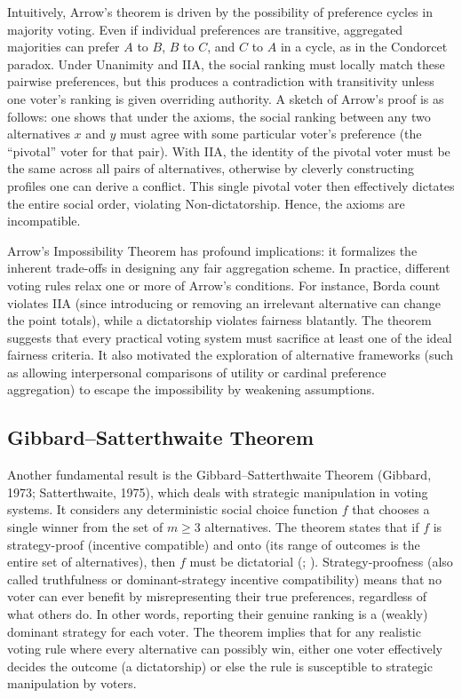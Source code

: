 \documentclass[
  letterpaper,
  numbers=noenddot,
  DIV=11]{scrreprt}
\theoremstyle{definition}
\theoremstyle{plain}
\theoremstyle{plain}
\theoremstyle{remark}
\begin{document}
Intuitively, Arrow's theorem is driven by the possibility of preference
cycles in majority voting. Even if individual preferences are
transitive, aggregated majorities can prefer \(A\) to \(B\), \(B\) to
\(C\), and \(C\) to \(A\) in a cycle, as in the Condorcet paradox. Under
Unanimity and IIA, the social ranking must locally match these pairwise
preferences, but this produces a contradiction with transitivity unless
one voter's ranking is given overriding authority. A sketch of Arrow's
proof is as follows: one shows that under the axioms, the social ranking
between any two alternatives \(x\) and \(y\) must agree with some
particular voter's preference (the ``pivotal'' voter for that pair).
With IIA, the identity of the pivotal voter must be the same across all
pairs of alternatives, otherwise by cleverly constructing profiles one
can derive a conflict. This single pivotal voter then effectively
dictates the entire social order, violating Non-dictatorship. Hence, the
axioms are incompatible.

Arrow's Impossibility Theorem has profound implications: it formalizes
the inherent trade-offs in designing any fair aggregation scheme. In
practice, different voting rules relax one or more of Arrow's
conditions. For instance, Borda count violates IIA (since introducing or
removing an irrelevant alternative can change the point totals), while a
dictatorship violates fairness blatantly. The theorem suggests that
every practical voting system must sacrifice at least one of the ideal
fairness criteria. It also motivated the exploration of alternative
frameworks (such as allowing interpersonal comparisons of utility or
cardinal preference aggregation) to escape the impossibility by
weakening assumptions.

\subsection{Gibbard--Satterthwaite
Theorem}\label{gibbardsatterthwaite-theorem}

Another fundamental result is the Gibbard--Satterthwaite Theorem
(Gibbard, 1973; Satterthwaite, 1975), which deals with strategic
manipulation in voting systems. It considers any deterministic social
choice function \(f\) that chooses a single winner from the set of
\(m\ge 3\) alternatives. The theorem states that if \(f\) is
strategy-proof (incentive compatible) and onto (its range of outcomes is
the entire set of alternatives), then \(f\) must be dictatorial
(;
).
Strategy-proofness (also called truthfulness or dominant-strategy
incentive compatibility) means that no voter can ever benefit by
misrepresenting their true preferences, regardless of what others do. In
other words, reporting their genuine ranking is a (weakly) dominant
strategy for each voter. The theorem implies that for any realistic
voting rule where every alternative can possibly win, either one voter
effectively decides the outcome (a dictatorship) or else the rule is
susceptible to strategic manipulation by voters.
\end{document}
